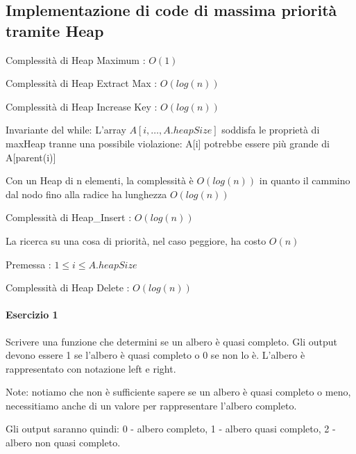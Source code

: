 \subsection{Implementazione di code di massima priorità tramite Heap}



{Complessità di Heap Maximum : $O(1)$}



{Complessità di Heap Extract Max : $O(log(n))$}



{Complessità di Heap Increase Key : $O(log(n))$}

{Invariante del while: L'array $A[i,\ldots,A.heapSize]$ soddisfa le proprietà di maxHeap tranne una possibile violazione: A{[}i{]} potrebbe essere più grande di A{[}parent(i){]}}

{Con un Heap di n elementi, la complessità è $O(log(n))$ in quanto il cammino dal nodo fino alla radice ha lunghezza }$O(log(n))$



{Complessità di Heap\_Insert : }$O(log(n))$

{La ricerca su una cosa di priorità, nel caso peggiore, ha costo }$O(n)$

{Premessa : $1 \leq i \leq A.heapSize$}



{Complessità di Heap Delete : }$O(log(n))$

\paragraph{Esercizio 1}

{Scrivere una funzione che determini se un albero è quasi completo. Gli output devono essere 1 se l'albero è quasi completo o 0 se non lo è. }{L'albero è rappresentato con notazione left e right.}

{Note: notiamo che non è sufficiente sapere se un albero è quasi completo o meno, necessitiamo anche di un valore per rappresentare l'albero completo.}

{Gli output saranno quindi: 0 - albero completo, 1 - albero quasi completo, 2 - albero non quasi completo.}






